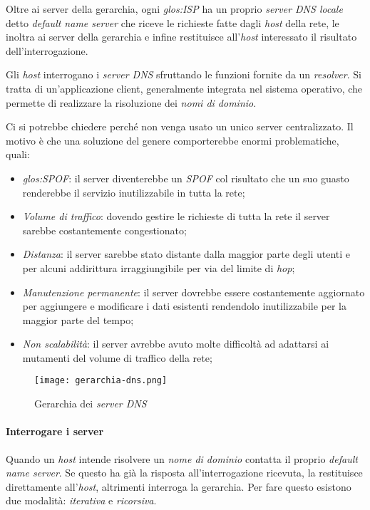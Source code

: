 Oltre ai server della gerarchia, ogni \emph{\gls{glos:ISP}} ha un proprio
\emph{server DNS locale} detto \emph{default name server} che riceve le richieste
fatte dagli \emph{host} della rete, le inoltra ai server della gerarchia e infine
restituisce all'\emph{host} interessato il risultato dell'interrogazione.

Gli \emph{host} interrogano i \emph{server DNS} sfruttando le funzioni fornite da
un \emph{resolver}. Si tratta di un’applicazione client, generalmente integrata
nel sistema operativo, che permette di realizzare la risoluzione dei \emph{nomi di
dominio}.

\begin{note}
    Ci si potrebbe chiedere perché non venga usato un unico server centralizzato.
    Il motivo è che una soluzione del genere comporterebbe enormi problematiche,
    quali:
    \begin{itemize}
        \item \emph{\gls{glos:SPOF}}: il server diventerebbe un \emph{SPOF} col
        risultato che un suo guasto renderebbe il servizio inutilizzabile in
        tutta la rete;
        \item \emph{Volume di traffico}: dovendo gestire le richieste di tutta la
        rete il server sarebbe costantemente congestionato;
        \item \emph{Distanza}: il server sarebbe stato distante dalla maggior parte
        degli utenti e per alcuni addirittura irraggiungibile per via del limite di
        \emph{hop};
        \item \emph{Manutenzione permanente}: il server dovrebbe essere costantemente
        aggiornato per aggiungere e modificare i dati esistenti rendendolo
        inutilizzabile per la maggior parte del tempo;
        \item \emph{Non scalabilità}: il server avrebbe avuto molte difficoltà ad
        adattarsi ai mutamenti del volume di traffico della rete;
    \end{itemize}
\end{note}

\begin{figure}[h]
    \centering
    \texttt{[image: gerarchia-dns.png]}
    \caption{Gerarchia dei \emph{server DNS}}
\end{figure}

\paragraph{Interrogare i server}
Quando un \emph{host} intende risolvere un \emph{nome di dominio} contatta il
proprio \emph{default name server}. Se questo ha già la risposta all'interrogazione
ricevuta, la restituisce direttamente all'\emph{host}, altrimenti interroga la
gerarchia. Per fare questo esistono due modalità: \emph{iterativa} e \emph{ricorsiva}.

